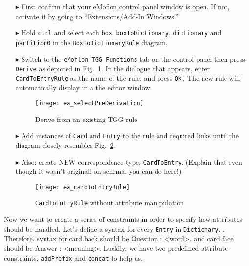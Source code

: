 \begin{enumerate}
  
\item[$\blacktriangleright$] First confirm that your eMoflon control panel window is open. If not, activate it by going to ``Extensions/Add-In Windows.''
  
\item[$\blacktriangleright$] Hold \texttt{ctrl} and select each \texttt{box}, \texttt{boxToDictionary}, \texttt{dictionary} and
\texttt{partition0} in the \texttt{Box\-To\-Dictionary\-Rule} diagram.
  
\item[$\blacktriangleright$] Switch to the \texttt{eMoflon TGG Functions} tab on the control panel then press \texttt{Derive} as depicted in
Fig.~\ref{fig:derive_from_tgg_rule}. In the dialogue that appears, enter \texttt{CardToEntryRule} as the name of the rule, and press \texttt{OK.} The new rule
will automatically display in a the editor window.

\begin{figure}[htbp]
\begin{center}
 \texttt{[image: ea\_selectPreDerivation]}
  \caption{Derive from an existing TGG rule}
  \label{fig:derive_from_tgg_rule}
\end{center}
\end{figure}
\FloatBarrier

\item[$\blacktriangleright$] Add instances of \texttt{Card} and \texttt{Entry} to the rule and required links until the diagram closely resembles
Fig.~\ref{fig:cardtoentry_1}.

\item[$\blacktriangleright$] Also: create NEW correspondence type, \texttt{CardToEntry}. (Explain that even though it wasn't originall on schema, you can do
here!)

  \begin{figure}[htbp]
  \begin{center}
    \texttt{[image: ea\_cardToEntryRule]}
    \caption{\texttt{CardToEntryRule} without attribute manipulation}
    \label{fig:cardtoentry_1}
  \end{center}
  \end{figure}

\end{enumerate}

Now we want to create a series of constraints in order to specify how attributes should be handled. Let's define a syntax for every \texttt{Entry} in
\texttt{Dictionary}. . Therefore, syntax for card.back should be Question : <word>, and card.face should be Answer : <meaning>.
Luckily, we have two predefined attribute constraints, \texttt{addPrefix} and \texttt{concat} to help us.

